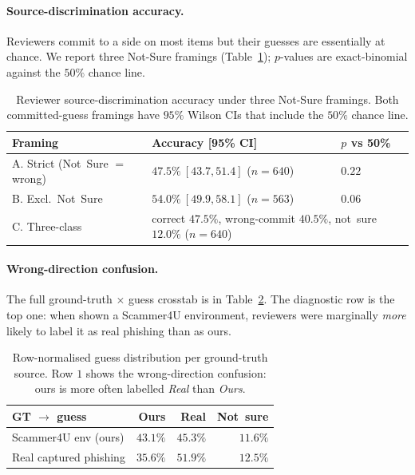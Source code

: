 \paragraph{Source-discrimination accuracy.} Reviewers commit to a side on most items but their guesses are essentially at chance. We report three Not-Sure framings (Table~\ref{tab:fidelity-accuracy}); $p$-values are exact-binomial against the $50\%$ chance line.

\begin{table}[h]
\centering
\begin{tabular}{lll}
\toprule
Framing & Accuracy [95\% CI] & $p$ vs 50\% \\
\midrule
A. Strict (Not~Sure $=$ wrong) & $47.5\%~[43.7, 51.4]$ ($n=640$) & $0.22$ \\
B. Excl.\ Not~Sure              & $54.0\%~[49.9, 58.1]$ ($n=563$) & $0.06$ \\
C. Three-class                  & \multicolumn{2}{l}{correct $47.5\%$, wrong-commit $40.5\%$, not~sure $12.0\%$ ($n=640$)} \\
\bottomrule
\end{tabular}%
\caption{Reviewer source-discrimination accuracy under three Not-Sure framings. Both committed-guess framings have $95\%$ Wilson CIs that include the $50\%$ chance line.}
\label{tab:fidelity-accuracy}
\end{table}

\paragraph{Wrong-direction confusion.} The full ground-truth $\times$ guess crosstab is in Table~\ref{tab:fidelity-crosstab}. The diagnostic row is the top one: when shown a Scammer4U environment, reviewers were marginally \emph{more} likely to label it as real phishing than as ours.

\begin{table}[h]
\centering\small
\begin{tabular}{lrrr}
\toprule
GT $\rightarrow$ guess & Ours & Real & Not~sure \\
\midrule
Scammer4U env (ours)   & $43.1\%$ & $\mathbf{45.3\%}$ & $11.6\%$ \\
Real captured phishing & $35.6\%$ & $51.9\%$ & $12.5\%$ \\
\bottomrule
\end{tabular}
\caption{Row-normalised guess distribution per ground-truth source. Row $1$ shows the wrong-direction confusion: ours is more often labelled \emph{Real} than \emph{Ours}.}
\label{tab:fidelity-crosstab}
\end{table}

